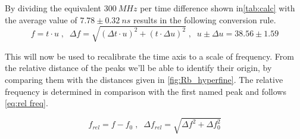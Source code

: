\documentclass[]{article}
\begin{document}
By dividing the equivalent $300\ MHz$ per time difference shown in\autoref{tab:calc} with the average value of $7.78 \pm 0.32\ ns$ results in the following conversion rule.
\begin{equation}
f=t\cdot u \;,\;\; \Delta f = \sqrt{(\Delta t \cdot u)^2+ (t \cdot \Delta u)^2} \;,\;\; u\pm\Delta u= 38.56 \pm 1.59
\label{eq:conversion rule}
\end{equation}


This will now be used to recalibrate the time axis to a scale of frequency. From the relative distance of the peaks we'll be able to identify their origin, by comparing them with the distances given in \autoref{fig:Rb_hyperfine}. 
The relative frequency is determined in comparison with the first named peak and follows \autoref{eq:rel freq}.

\begin{equation}
f_{rel} = f - f_0 \;,\;\; \Delta f_{rel} = \sqrt{ \Delta f^2 + \Delta f_0^2}
\label{eq:rel freq}
\end{equation}


\newpage
\end{document}
